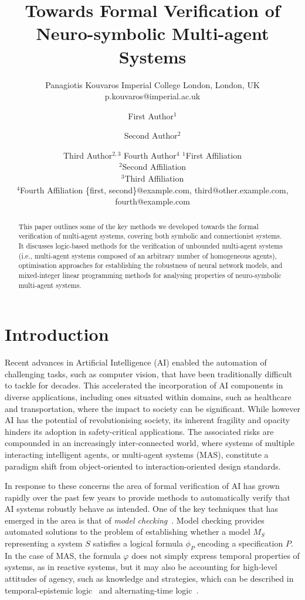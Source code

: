 \documentclass{article}
\title{Towards Formal Verification of Neuro-symbolic Multi-agent Systems}
\author{
    Panagiotis Kouvaros
    \affiliations
    Imperial College London, London, UK
    \emails
    p.kouvaros@imperial.ac.uk
}
\author{
First Author$^1$
\and
Second Author$^2$\and
Third Author$^{2,3}$\And
Fourth Author$^4$
\affiliations
$^1$First Affiliation\\
$^2$Second Affiliation\\
$^3$Third Affiliation\\
$^4$Fourth Affiliation
\emails
\{first, second\}@example.com,
third@other.example.com,
fourth@example.com
}
\begin{document}
\maketitle

\begin{abstract}

This paper outlines some of the key methods we developed towards the formal
    verification of multi-agent systems, covering both symbolic and
    connectionist systems.  It discusses logic-based methods for the
    verification of unbounded multi-agent systems (i.e., multi-agent systems
    composed of an arbitrary number of homogeneous agents), optimisation
    approaches for establishing the robustness of neural network models, and
    mixed-integer linear programming methods for analysing properties of
    neuro-symbolic multi-agent systems.

\end{abstract}

\section{Introduction}

Recent advances in  Artificial Intelligence (AI)  enabled the automation of
challenging tasks, such as computer vision, that have been traditionally
difficult to tackle for decades. This accelerated the incorporation of  AI
components in  diverse applications, including ones situated within domains, such as
healthcare and transportation, where the impact to society can be significant.
While however AI has the potential of revolutionising society,  its inherent
fragility and opacity   hinders its adoption in safety-critical applications.
The associated risks are compounded in an increasingly inter-connected
world, where systems of
multiple interacting intelligent agents, or multi-agent systems (MAS),
constitute a paradigm shift from object-oriented to interaction-oriented design
standards. 

In response to these concerns the area of formal verification of AI has grown
rapidly over the past few years to provide methods to automatically verify that
AI systems robustly behave as intended.
One of the key techniques that has emerged in the area is that of {\em model
checking}~\cite{Clarke+99a}. Model checking provides automated solutions to 
the problem of establishing whether a model $M_S$ representing a system $S$ satisfies a
logical formula $\phi_P$ encoding a specification $P$. In the case of MAS,
the formula $\varphi$ does not simply express temporal properties of systems, as
in reactive systems, but it may also be accounting for high-level attitudes of
agency, such as knowledge and strategies, which can be described in
temporal-epistemic logic~\cite{Fagin+95b} and alternating-time
logic~\cite{Alur+98a}.
\end{document}
